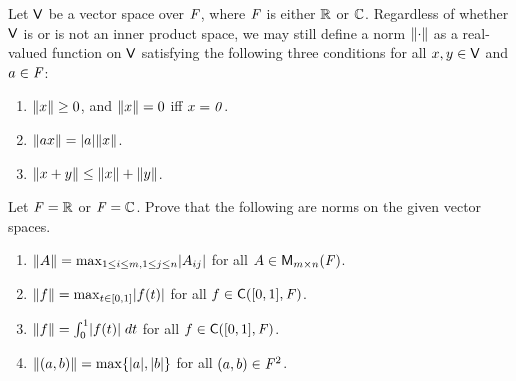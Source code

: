 \begin{defn}\label{6.1.14}
	Let \(\mathsf{V}\) be a vector space over \(\mathit{F}\), where \(\mathit{F}\) is either \(\mathbb{R}\) or \(\mathbb{C}\).
	Regardless of whether \(\mathsf{V}\) is or is not an inner product space, we may still define a norm \(\left\lVert\cdot\right\rVert\) as a real-valued function on \(\mathsf{V}\) satisfying the following three conditions for all \(x, y \in \mathsf{V}\) and \(a \in \mathit{F}\):
	\begin{enumerate}
		\item \(\left\lVert x\right\rVert \geq 0\), and \(\left\lVert x\right\rVert = 0\) iff \(x = \mathit{0}\).
		\item \(\norm{ax} = \abs{a} \norm{x}\).
		\item \(\left\lVert x + y\right\rVert \leq \left\lVert x\right\rVert + \left\lVert y\right\rVert\).
	\end{enumerate}
\end{defn}

\begin{ex}\label{ex:6.1.24}
	Let \(\mathit{F} = \mathbb{R}\) or \(\mathit{F} = \mathbb{C}\).
	Prove that the following are norms on the given vector spaces.
	\begin{enumerate}
		\item \(\norm{A} = \max_{1 \leq i \leq m, 1 \leq j \leq n} \abs{A_{i j}}\) for all \(A \in \mathsf{M}_{{m} \times n}({\mathit{F}})\).
		\item \(\norm{f} = \max_{t \in [0, 1]} \abs{f(t)}\) for all \(f \in \cfs([0, 1], \F)\).
		\item \(\norm{f} = \int_0^1 \abs{f(t)} \; dt\) for all \(f \in \cfs([0, 1], \F)\).
		\item \(\norm{(a, b)} = \max\set{\abs{a}, \abs{b}}\) for all \((a, b) \in \mathit{F}^2\).
	\end{enumerate}
\end{ex}

